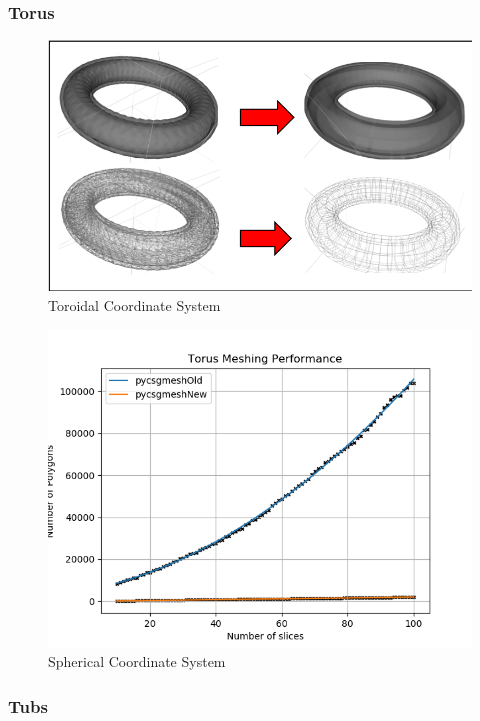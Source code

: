 \documentclass[12pt,a4paper]{article}
\begin{document}
\newpage
\subsubsection{Torus}

\begin{figure}[h!]
\centering
\includegraphics[scale=0.5]{Images//Meshes//torus.png}
\caption[width=\columnwidth]{Toroidal Coordinate System}
\label{conts}
\end{figure}

\begin{figure}[h!]
\centering
\includegraphics[scale=0.5]{Images//Quad_fits//Torus_quad.png}
\caption[width=\columnwidth]{Spherical Coordinate System}
\label{conts}
\end{figure}


\newpage
\subsubsection{Tubs}
\end{document}
